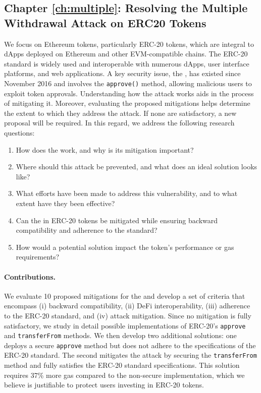 \subsection*{Chapter \ref{ch:multiple}: Resolving the Multiple Withdrawal Attack on ERC20 Tokens}
We focus on Ethereum tokens, particularly ERC-20 tokens, which are integral to dApps deployed on Ethereum and other EVM-compatible chains. The ERC-20 standard is widely used and interoperable with numerous dApps, user interface platforms, and web applications. A key security issue, the \mwa, has existed since November 2016 and involves the \texttt{approve()} method, allowing malicious users to exploit token approvals. Understanding how the attack works aids in the process of mitigating it. Moreover, evaluating the proposed mitigations helps determine the extent to which they address the attack. If none are satisfactory, a new proposal will be required. In this regard, we address the following research questions:
\begin{enumerate}[label={(RQ5.\arabic*)},leftmargin=*]
	\item How does the \mwa work, and why is its mitigation important?
	\item Where should this attack be prevented, and what does an ideal solution looks like?
	\item What efforts have been made to address this vulnerability, and to what extent have they been effective?
	\item Can the \mwa in ERC-20 tokens be mitigated while ensuring backward compatibility and adherence to the standard?
	\item How would a potential solution impact the token's performance or gas requirements?
\end{enumerate}
\paragraph{Contributions.} We evaluate 10 proposed mitigations for the \mwa and develop a set of criteria that encompass (i) backward compatibility, (ii) DeFi interoperability, (iii) adherence to the ERC-20 standard, and (iv) attack mitigation. Since no mitigation is fully satisfactory, we study in detail possible implementations of ERC-20's \texttt{approve} and \texttt{transferFrom} methods. We then develop two additional solutions: one deploys a secure \texttt{approve} method but does not adhere to the specifications of the ERC-20 standard. The second mitigates the attack by securing the \texttt{transferFrom} method and fully satisfies the ERC-20 standard specifications. This solution requires 37\% more gas compared to the non-secure implementation, which we believe is justifiable to protect users investing in ERC-20 tokens.

